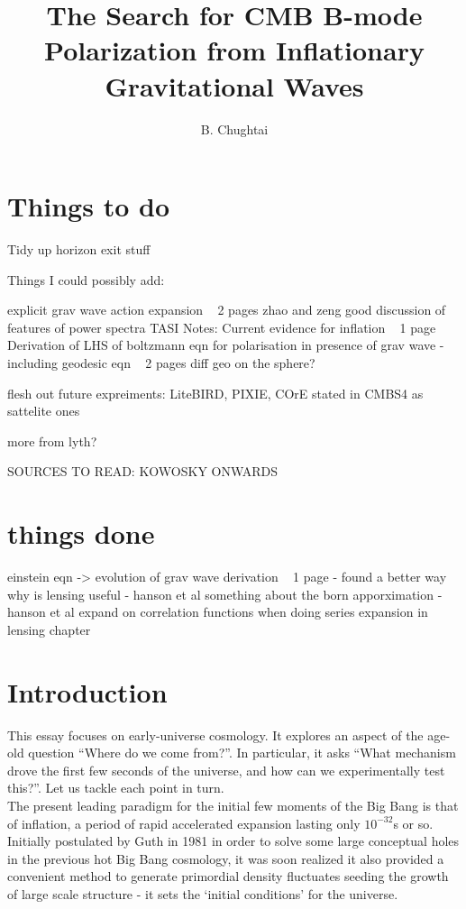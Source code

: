 \documentclass[a4paper,10pt]{article}
\title{\boldmath The Search for CMB B-mode Polarization from Inflationary Gravitational Waves}
\author{B. Chughtai}
\affiliation{University of Cambridge, Cambridge, UK}
\begin{document}
\maketitle
\flushbottom

\section{Things to do}

Tidy up horizon exit stuff

Things I could possibly add:


explicit grav wave action expansion ~ 2 pages 
zhao and zeng good discussion of features of power spectra
TASI Notes: Current evidence for inflation ~ 1 page
Derivation of LHS of boltzmann eqn for polarisation in presence of grav wave - including geodesic eqn ~ 2 pages
diff geo on the sphere?





flesh out future expreiments: LiteBIRD, PIXIE, COrE stated in CMBS4 as sattelite ones

more from lyth?


SOURCES TO READ: KOWOSKY ONWARDS




\section{things done}
einstein eqn -> evolution of grav wave derivation ~ 1 page - found a better way
why is lensing useful - hanson et al
something about the born apporximation	 - hanson et al
expand on correlation functions when doing series expansion in lensing chapter

\section{Introduction}


This essay focuses on early-universe cosmology. It explores an aspect of the age-old question ``Where do we come from?''. In particular, it asks ``What mechanism drove the first few seconds of the universe, and how can we experimentally test this?''. Let us tackle each point in turn.\\

The present leading paradigm for the initial few moments of the Big Bang is that of inflation, a period of rapid accelerated expansion lasting only $10^{-32}$s or so. Initially postulated by Guth in 1981 \cite{Guth} in order to solve some large conceptual holes in the previous hot Big Bang cosmology, it was soon realized it also provided a convenient method to generate primordial density fluctuates seeding the growth of large scale structure - it sets the `initial conditions' for the universe. \\
\end{document}
